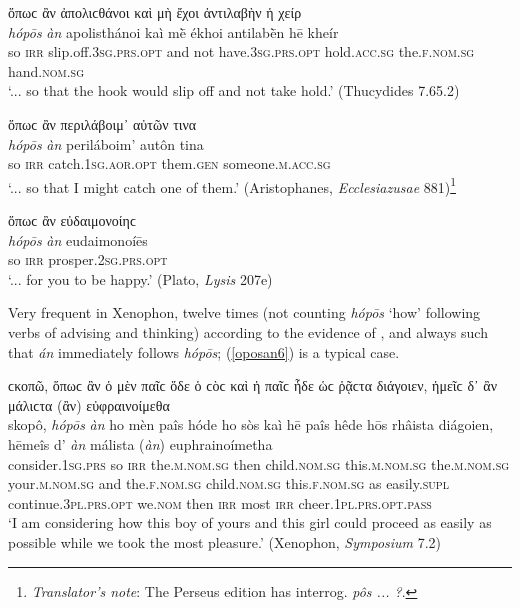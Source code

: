 \begin{exe}
\ex ὅπωϲ ἂν ἀπολιϲθάνοι καὶ μὴ ἔχοι ἀντιλαβὴν ἡ χείρ\\
\gll \emph{hópōs} \emph{àn} apolisthánoi kaì mḕ ékhoi antilabḕn hē kheír\\
so \textsc{irr} slip.off.\textsc{3sg.prs.opt} and not have.\textsc{3sg.prs.opt} hold.\textsc{acc.sg} the.\textsc{f.nom.sg} hand.\textsc{nom.sg}\\
\trans `... so that the hook would slip off and not take hold.' (Thucydides 7.65.2)
\label{oposan3}
\end{exe}

\begin{exe}
\ex ὅπωϲ ἂν περιλάβοιμ᾽ αὐτῶν τινα\\
\gll \emph{hópōs} \emph{àn} periláboim' autôn tina\\
so \textsc{irr} catch.\textsc{1sg.aor.opt} them.\textsc{gen}
someone.\textsc{m.acc.sg}\\
\trans `... so that I might catch one of them.' (Aristophanes, \textit{Ecclesiazusae} 881)\footnote{\emph{Translator's note}: The Perseus edition has interrog. \textit{pôs ... ?}.}
\label{oposan4}
\end{exe}

\begin{exe}
\ex ὅπωϲ ἂν εὐδαιμονοίηϲ\\
\gll \emph{hópōs} \emph{àn} eudaimonoíēs\\
so \textsc{irr} prosper.\textsc{2sg.prs.opt}\\
\trans `... for you to be happy.' (Plato, \textit{Lysis} 207e)
\label{oposan5}
\end{exe}

Very frequent in Xenophon, twelve times (not counting \emph{hópōs} `how' following verbs of advising and thinking) according to the evidence of \citet[83ff.]{Weber1885}, and always such that \emph{án} immediately follows \emph{hópōs}; (\ref{oposan6}) is a typical case.

\begin{exe}
\ex ϲκοπῶ, ὅπωϲ ἂν ὁ μὲν παῖϲ ὅδε ὁ ϲὸϲ καὶ ἡ παῖϲ ἧδε ὡϲ ῥᾷϲτα
διάγοιεν, ἡμεῖϲ δ᾽ ἂν μάλιϲτα (ἂν) εὐφραινοίμεθα\\
\gll skopô, \emph{hópōs} \emph{àn} ho mèn paîs hóde ho sòs kaì hē paîs hêde hōs rhâista diágoien, hēmeîs d' \emph{àn} málista (\emph{àn}) euphrainoímetha\\
consider.\textsc{1sg.prs} so \textsc{irr} the.\textsc{m.nom.sg} then child.\textsc{nom.sg} this.\textsc{m.nom.sg} the.\textsc{m.nom.sg} your.\textsc{m.nom.sg} and the.\textsc{f.nom.sg} child.\textsc{nom.sg} this.\textsc{f.nom.sg} as easily.\textsc{supl} continue.\textsc{3pl.prs.opt} we.\textsc{nom} then \textsc{irr} most \textsc{irr} cheer.\textsc{1pl.prs.opt.pass}\\
\trans `I am considering how this boy of yours and this girl could proceed as easily as possible while we took the most pleasure.' (Xenophon, \textit{Symposium} 7.2)
\label{oposan6}
\end{exe}


